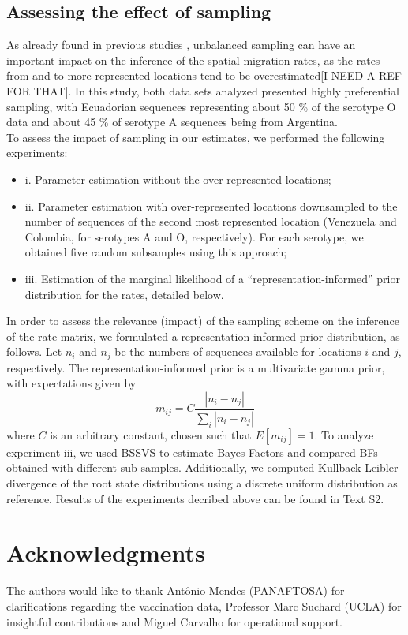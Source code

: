 \documentclass[10pt]{article}
\begin{document}
\subsection{Assessing the effect of sampling}
\indent As already found in previous studies \cite{Faria2012, Lemey2013}, unbalanced sampling can have an important impact on the inference of the spatial migration rates, as the rates from and to more represented locations tend to be overestimated[I NEED A REF FOR THAT]. In this study, both data sets analyzed presented highly preferential sampling, with Ecuadorian sequences representing about 50 \% of the serotype O data and about 45 \% of serotype A sequences being from Argentina.\\
\indent To assess the impact of sampling in our estimates, we performed the following experiments:
\begin{itemize}
 \item i. Parameter estimation without the over-represented locations;
 \item ii. Parameter estimation with over-represented locations downsampled to the number of sequences of the second most represented location (Venezuela and Colombia, for serotypes A and O, respectively). For each serotype, we obtained five random subsamples using this approach;
 \item iii. Estimation of the marginal likelihood of a ``representation-informed'' prior distribution for the rates, detailed below.
\end{itemize}
\indent In order to assess the relevance (impact) of the sampling scheme on the inference of the rate matrix, we formulated a representation-informed prior distribution, as follows. Let $n_i$ and $n_j$ be the numbers of sequences available for locations $i$ and $j$, respectively. The representation-informed prior is a multivariate gamma prior, with expectations given by
\begin{equation}
 m_{ij}=C\frac{|n_i-n_j|}{\sum_i|n_i-n_j|}
\end{equation}
where $C$ is an arbitrary constant, chosen such that $E[m_{ij}]=1$. To analyze experiment iii, we used BSSVS to estimate Bayes Factors and compared BFs obtained with different sub-samples. Additionally, we computed Kullback-Leibler divergence \cite{KL,roots} of the root state distributions using a discrete uniform distribution as reference. Results of the experiments decribed above can be found in Text S2.\\
\section*{Acknowledgments}
The authors would like to thank Ant\^onio Mendes (PANAFTOSA) for clarifications regarding the vaccination data, Professor Marc Suchard (UCLA) for insightful contributions and Miguel Carvalho for operational support.\\
\newpage

\newpage
\end{document}
